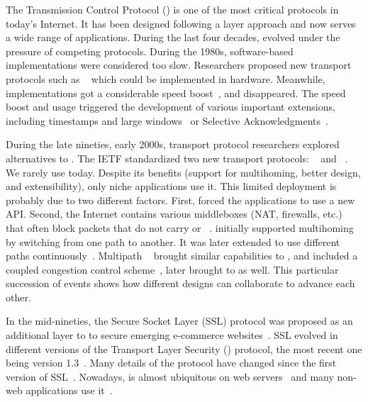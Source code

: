 The Transmission Control Protocol (\tcp) \cite{rfc793} is one of the most
critical protocols in today's Internet. It has been designed following a
layer approach and now serves a wide range of
applications. During the last four decades, \tcp evolved under
the pressure of competing protocols. During the 1980s, software-based \tcp
implementations were considered too slow. Researchers proposed new transport
protocols such as \xtp~\cite{sanders1990xpress} which could be implemented in
hardware. Meanwhile, \tcp implementations got a considerable speed
boost~\cite{clark1989analysis}, and \xtp disappeared. The \tcp speed boost and
usage triggered the development of various important \tcp extensions, including
timestamps and large windows~\cite{rfc1323} or Selective
Acknowledgments~\cite{rfc2018}.

During the late nineties, early 2000s, transport protocol researchers explored
alternatives to \tcp. The IETF standardized two new transport protocols:
\dccp~\cite{kohler2006designing} and \sctp~\cite{rfc4960}. We rarely use \dccp
today. Despite its benefits (support for multihoming, better design, and
extensibility), only niche applications use it. This limited deployment is
probably due to two different factors. First, \sctp forced the applications to %
use a new API. Second, the Internet contains various middleboxes (NAT,
firewalls, etc.) that often block packets that do not carry \tcp or
\udp~\cite{honda2011still}.  \sctp initially supported multihoming by switching
from one path to another. It was later extended to use different
paths continuously~\cite{iyengar2006concurrent}.  Multipath
\tcp~\cite{rfc6824,raiciu2012hard} brought similar capabilities to \tcp, and
included a coupled congestion control scheme~\cite{wischik2011design}, later
brought to \sctp as well. This particular succession of events shows how
different designs can collaborate to advance each other.

In the mid-nineties, the Secure Socket Layer (SSL) protocol was proposed as an
additional layer to \tcp to secure emerging e-commerce websites~\cite{draft-hickman-netscape-ssl}. SSL evolved in different versions of the Transport Layer Security (\tls) protocol, the most recent one being version 1.3~\cite{rfc8446}. Many details of the \tls protocol have changed since the first version of SSL~\cite{kotzias2018coming}. Nowadays, \tls is almost ubiquitous on web servers~\cite{holz2019era} and many non-web applications use it~\cite{anderson2019tls}.

